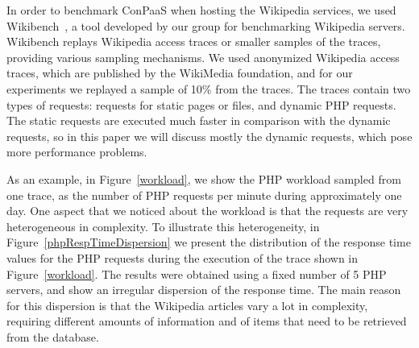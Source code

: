 In order to benchmark ConPaaS when hosting the Wikipedia services, we
used Wikibench~\cite{wikibench}, a tool developed by our group for 
benchmarking Wikipedia servers. Wikibench replays Wikipedia access
traces or smaller samples of the traces, providing various sampling
mechanisms. We used anonymized Wikipedia access traces, which are 
published by the WikiMedia foundation, and for our experiments we
replayed a sample of 10\% from the traces. The traces contain two 
types of requests: requests for static pages or files, and dynamic
PHP requests. The static requests are executed much faster in comparison
with the dynamic requests, so in this paper we will discuss mostly
the dynamic requests, which pose more performance problems.  



As an example, in Figure~\ref{workload}, we show the PHP workload 
sampled from one trace, as the number of PHP requests per minute 
during approximately one day. One aspect that we noticed about the 
workload is that the requests are very heterogeneous in complexity.
To illustrate this heterogeneity, in Figure~\ref{phpRespTimeDispersion}
we present the distribution of the response time values for the PHP 
requests during the execution of the trace shown in Figure~\ref{workload}.
The results were obtained using a fixed number of 5 PHP servers,
and show an irregular dispersion of the response time. The main reason
for this dispersion is that the Wikipedia articles vary a lot in complexity,
requiring different amounts of information and of items that
need to be retrieved from the database. 


